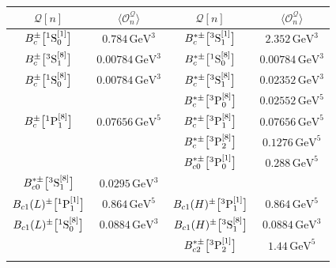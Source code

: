 \newpage
\vspace*{\fill}
\renewcommand*{\arraystretch}{1.4}
\begin{longtable}[t]{cc|cc}
\toprule
${\mathcal Q}[n]$ & $\langle \mathcal O_{n}^{\mathcal Q} \rangle$ 
&
${\mathcal Q}[n]$ & $\langle \mathcal O_{n}^{\mathcal Q} \rangle$ \\
\midrule\endhead
$B_c^\pm\big[{}^1\mathrm{S}_0^{[1]}\big]$        & $0.784   \,\mathrm{GeV}^{3}$ & 
$B_c^{\ast \pm}\big[{}^3\mathrm{S}_1^{[1]}\big]$ & $2.352   \,\mathrm{GeV}^{3}$ \\
$B_c^\pm\big[{}^3\mathrm{S}_1^{[8]}\big]$        & $0.00784 \,\mathrm{GeV}^{3}$ & 
$B_c^{\ast \pm}\big[{}^1\mathrm{S}_0^{[8]}\big]$ & $0.00784 \,\mathrm{GeV}^{3}$ \\
$B_c^\pm\big[{}^1\mathrm{S}_0^{[8]}\big]$        & $0.00784 \,\mathrm{GeV}^{3}$ & 
$B_c^{\ast \pm}\big[{}^3\mathrm{S}_1^{[8]}\big]$ & $0.02352 \,\mathrm{GeV}^{3}$ \\
                                             &                              & 
$B_c^{\ast \pm}\big[{}^3\mathrm{P}_0^{[8]}\big]$ & $0.02552 \,\mathrm{GeV}^{5}$ \\
$B_c^\pm\big[{}^1\mathrm{P}_1^{[8]}\big]$        & $0.07656 \,\mathrm{GeV}^{5}$ & 
$B_c^{\ast \pm}\big[{}^3\mathrm{P}_1^{[8]}\big]$ & $0.07656 \,\mathrm{GeV}^{5}$ \\
                                             &                              & 
$B_c^{\ast \pm}\big[{}^3\mathrm{P}_2^{[8]}\big]$ & $0.1276  \,\mathrm{GeV}^{5}$ \\
\midrule
                                                &                             & 
$B_{c0}^{\ast \pm}\big[{}^3\mathrm{P}_0^{[1]}\big]$ & $0.288  \,\mathrm{GeV}^{5}$ \\
$B_{c0}^{\ast \pm}\big[{}^3\mathrm{S}_1^{[8]}\big]$ & $0.0295 \,\mathrm{GeV}^{3}$ \\
$B_{c1}(L)^\pm\big[{}^1\mathrm{P}_1^{[1]}\big]$     & $0.864  \,\mathrm{GeV}^{5}$ & 
$B_{c1}(H)^{\pm}\big[{}^3\mathrm{P}_1^{[1]}\big]$   & $0.864  \,\mathrm{GeV}^{5}$ \\
$B_{c1}(L)^\pm\big[{}^1\mathrm{S}_0^{[8]}\big]$     & $0.0884 \,\mathrm{GeV}^{3}$ & 
$B_{c1}(H)^{\pm}\big[{}^3\mathrm{S}_1^{[8]}\big]$   & $0.0884 \,\mathrm{GeV}^{3}$ \\
                                                &                             & 
$B_{c2}^{\ast \pm}\big[{}^3\mathrm{P}_2^{[1]}\big]$ & $1.44   \,\mathrm{GeV}^{5}$ \\
                                                &                             & 

\end{longtable}
